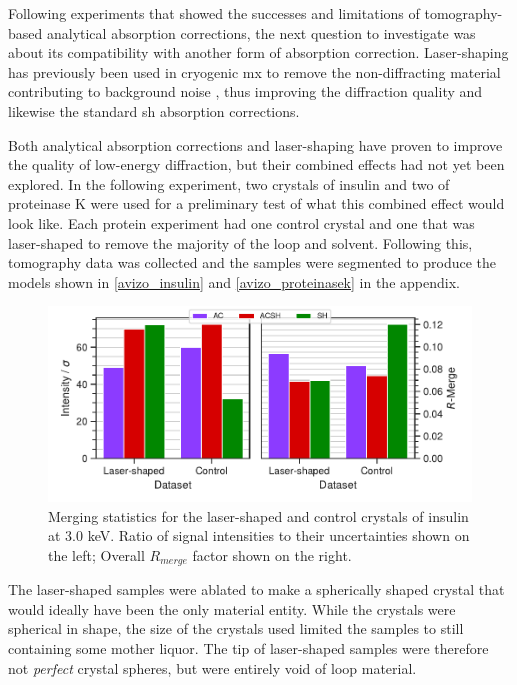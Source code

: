 Following experiments that showed the successes and limitations of tomography-based analytical absorption corrections, the next question to investigate was about its compatibility with another form of absorption correction. Laser-shaping has previously been used in cryogenic \ac{mx} to remove the non-diffracting material contributing to background noise \cite{Basu2019}, thus improving the diffraction quality and likewise the standard \ac{sh} absorption corrections. %

Both analytical absorption corrections and laser-shaping have proven to improve the quality of low-energy diffraction, but their combined effects had not yet been explored. In the following experiment, two crystals of insulin and two of proteinase K were used for a preliminary test of what this combined effect would look like. Each protein experiment had one control crystal and one that was laser-shaped to remove the majority of the loop and solvent. Following this, tomography data was collected and the samples were segmented to produce the models shown in \cref{avizo_insulin} and \cref{avizo_proteinasek} in the appendix.

\begin{figure}[h]
    \centering
    \includegraphics{plots/exp2/ins_stats.pdf}
    \caption{Merging statistics for the laser-shaped and control crystals of insulin at 3.0 \unit{keV}. Ratio of signal intensities to their uncertainties shown on the left; Overall $R_{merge}$ factor shown on the right.}
    \label{fig:insulin}
\end{figure}

The laser-shaped samples were ablated to make a spherically shaped crystal that would ideally have been the only material entity. While the crystals were spherical in shape, the size of the crystals used limited the samples to still containing some mother liquor. The tip of laser-shaped samples were therefore not \textit{perfect} crystal spheres, but were entirely void of loop material.

